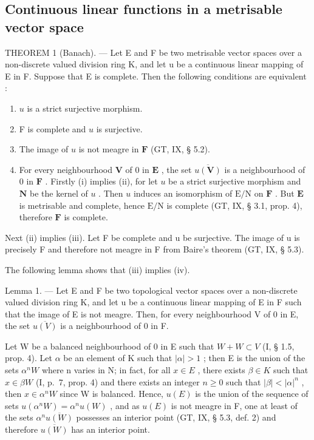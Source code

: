 \subsection{Continuous linear functions in a metrisable vector space}

THEOREM 1 (Banach). --- Let E and F be two metrisable vector spaces over a non-discrete valued division ring K, and let u be a continuous linear mapping of E in F. Suppose that E is complete. Then the following conditions are equivalent :

\begin{enumerate}
\def\labelenumi{(\roman{enumi})}
\item
  \(u\) is a strict surjective morphism.
\item
  F is complete and \(u\) is surjective.
\item
  The image of \(u\) is not meagre in \(\mathbf{F}\) (GT, IX, § 5.2).
\item
  For every neighbourhood \(\mathbf{V}\) of 0 in \(\mathbf{E}\) , the set \(\overline{u(\mathbf{V})}\) is a neighbourhood of 0 in \(\mathbf{F}\) . Firstly (i) implies (ii), for let \(u\) be a strict surjective morphism and \(\mathbf{N}\) be the kernel of \(u\) . Then \(u\) induces an isomorphism of \(\mathrm{E/N}\) on \(\mathbf{F}\) . But \(\mathbf{E}\) is metrisable and complete, hence \(\mathrm{E/N}\) is complete (GT, IX, § 3.1, prop. 4), therefore \(\mathbf{F}\) is complete.
\end{enumerate}

Next (ii) implies (iii). Let F be complete and u be surjective. The image of u is precisely F and therefore not meagre in F from Baire's theorem (GT, IX, § 5.3).

The following lemma shows that (iii) implies (iv).

Lemma 1. --- Let E and F be two topological vector spaces over a non-discrete valued division ring K, and let u be a continuous linear mapping of E in F such that the image of E is not meagre. Then, for every neighbourhood V of 0 in E, the set \(\overline{u(V)}\) is a neighbourhood of 0 in F.

Let W be a balanced neighbourhood of 0 in E such that \(W + W \subset V\) (I, § 1.5, prop. 4). Let \(\alpha\) be an element of K such that \(|\alpha| > 1\) ; then E is the union of the sets \(\alpha^{n}W\) where n varies in N; in fact, for all \(x \in E\) , there exists \(\beta \in K\) such that \(x \in \beta W\) (I, p.~7, prop. 4) and there exists an integer \(n \geqslant 0\) such that \(|\beta| < |\alpha|^{n}\) , then \(x \in \alpha^{n}W\) since W is balanced. Hence, \(u(E)\) is the union of the sequence of sets \(u(\alpha^{n}W) = \alpha^{n}u(W)\) , and as \(u(E)\) is not meagre in F, one at least of the sets \(\alpha^{n}\overline{u(W)}\) possesses an interior point (GT, IX, § 5.3, def. 2) and therefore \(\overline{u(W)}\) has an interior point.

